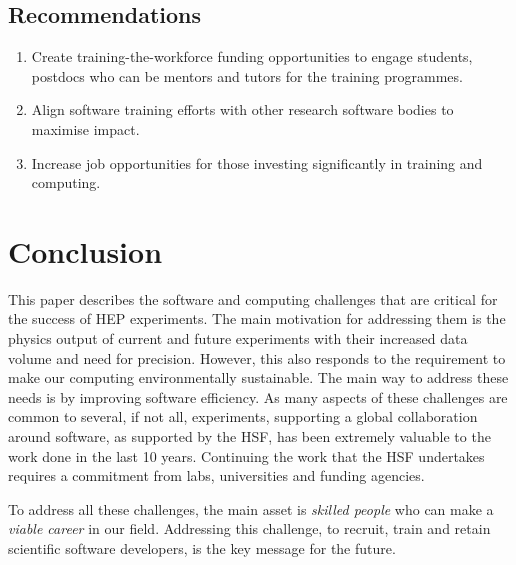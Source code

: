 \documentclass[10pt,a4paper]{article}
\begin{document}
\subsection{Recommendations}\label{recommendations-4}

\begin{enumerate}
\def\labelenumi{\arabic{enumi}.}
\item
  Create training-the-workforce funding opportunities to engage
  students, postdocs who can be mentors and tutors for the
  training programmes.
\item
  Align software training efforts with other research software bodies to
  maximise impact.
\item
  Increase job opportunities for those investing significantly in
  training and computing.
\end{enumerate}

\section{Conclusion}\label{conclusion}

This paper describes the software and computing challenges that are
critical for the success of HEP experiments. The main motivation for
addressing them is the physics output of current and future experiments
with their increased data volume and need for precision. However, this
also responds to the requirement to make our computing environmentally
sustainable. The main way to address these needs is by improving
software efficiency. As many aspects of these challenges are common to
several, if not all, experiments, supporting a global collaboration
around software, as supported by the HSF, has been extremely valuable to the
work done in the last 10 years. Continuing the work that the HSF undertakes 
requires a commitment from labs, universities and funding agencies.

To address all these challenges, the main asset is \emph{skilled people}
who can make a \emph{viable career} in our field. Addressing this
challenge, to recruit, train and retain scientific software developers,
is the key message for the future.

\newpage
\sloppy
\printbibliography
\end{document}
